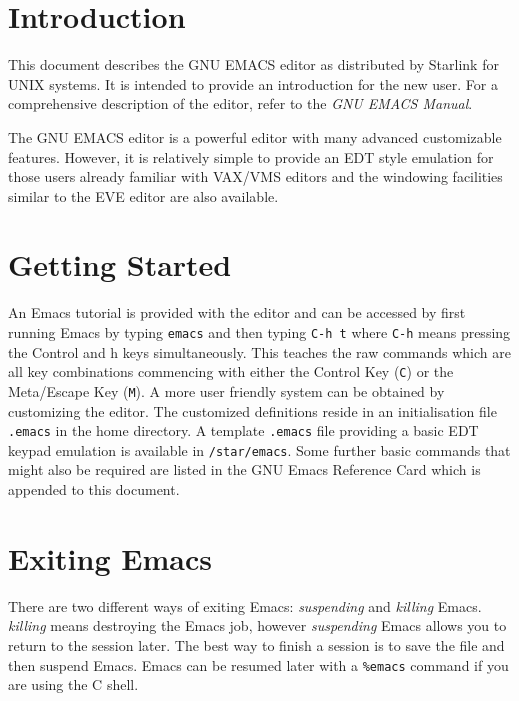 \documentclass[11pt,nolof,noabs]{starlink}
\begin{document}
\scfrontmatter

\section{Introduction}

This document describes the GNU EMACS editor as distributed by Starlink
for UNIX systems. It is intended to provide an introduction for the
new user. For a comprehensive description of the editor, refer to
the \textit{GNU EMACS Manual}.


The GNU EMACS editor is a powerful editor with many advanced customizable
features.
However, it is relatively simple to provide
an EDT style emulation
for those users already familiar with VAX/VMS editors and the windowing
facilities similar to the EVE editor are also available.

\section{Getting Started}

An Emacs tutorial is provided with the editor and can be accessed
by first running Emacs by typing \texttt{emacs} and then typing \texttt{C-h t}
where \texttt{C-h} means pressing the Control and h keys simultaneously.
This teaches the raw commands which are all key combinations commencing
with either the Control Key (\texttt{C}) or the Meta/Escape Key (\texttt{M}).
A more
user friendly system can be obtained by customizing the editor.
The customized definitions reside in an initialisation file \texttt{.emacs}
in the home directory. A template \texttt{.emacs} file providing
a basic EDT keypad emulation is available in \texttt{/star/emacs}.
Some further basic commands that might also be required are listed
in the GNU Emacs Reference Card which is appended to this document.

\section{Exiting Emacs}

There are two different ways of exiting Emacs: \textit{suspending} and
\textit{killing} Emacs. \textit{killing} means destroying the Emacs job,
however \textit{suspending} Emacs allows you to return to the session later.
The best way to finish a session is to save the file and then suspend
Emacs. Emacs can be resumed later with a \texttt{\%emacs} command if you are
using the C shell.
\end{document}
